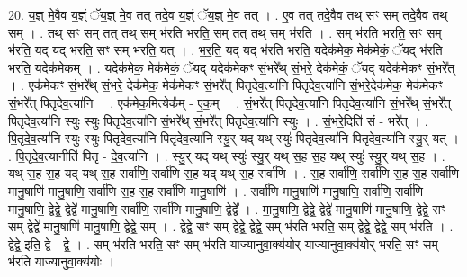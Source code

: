\documentclass[17pt]{extarticle}
\begin{document}
20. य॒ज्ञ् मे॒वैव य॒ज्ञ्ं ॅय॒ज्ञ् मे॒व तत् तदे॒व य॒ज्ञ्ं ॅय॒ज्ञ् मे॒व तत् । . ए॒व तत् तदे॒वैव तथ् सꣳ सम् तदे॒वैव तथ् सम् । . तथ् सꣳ सम् तत् तथ् सम् भ॑रति भरति॒ सम् तत् तथ् सम् भ॑रति । . सम् भ॑रति भरति॒ सꣳ सम् भ॑रति॒ यद् यद् भ॑रति॒ सꣳ सम् भ॑रति॒ यत् । . भ॒र॒ति॒ यद् यद् भ॑रति भरति॒ यदेक॑मेक॒ मेक॑मेकं॒ ॅयद् भ॑रति भरति॒ यदेक॑मेकम् । . यदेक॑मेक॒ मेक॑मेकं॒ ॅयद् यदेक॑मेकꣳ सं॒भरे᳚थ् सं॒भरे॒ देक॑मेकं॒ ॅयद् यदेक॑मेकꣳ सं॒भरे᳚त् । . एक॑मेकꣳ सं॒भरे᳚थ् सं॒भरे॒ देक॑मेक॒ मेक॑मेकꣳ सं॒भरे᳚त् पितृदेव॒त्या॑नि पितृदेव॒त्या॑नि सं॒भरे॒देक॑मेक॒ मेक॑मेकꣳ सं॒भरे᳚त् पितृदेव॒त्या॑नि । . एक॑मेक॒मित्येक᳚म् - ए॒क॒म् । . सं॒भरे᳚त् पितृदेव॒त्या॑नि पितृदेव॒त्या॑नि सं॒भरे᳚थ् सं॒भरे᳚त् पितृदेव॒त्या॑नि स्युः स्युः पितृदेव॒त्या॑नि सं॒भरे᳚थ् सं॒भरे᳚त् पितृदेव॒त्या॑नि स्युः । . सं॒भरे॒दिति॑ सं - भरे᳚त् । . पि॒तृ॒दे॒व॒त्या॑नि स्युः स्युः पितृदेव॒त्या॑नि पितृदेव॒त्या॑नि स्यु॒र् यद् यथ् स्युः॑ पितृदेव॒त्या॑नि पितृदेव॒त्या॑नि स्यु॒र् यत् । . पि॒तृ॒दे॒व॒त्या॑नीति॑ पितृ - दे॒व॒त्या॑नि । . स्यु॒र् यद् यथ् स्युः॑ स्यु॒र् यथ् स॒ह स॒ह यथ् स्युः॑ स्यु॒र् यथ् स॒ह । . यथ् स॒ह स॒ह यद् यथ् स॒ह सर्वा॑णि॒ सर्वा॑णि स॒ह यद् यथ् स॒ह सर्वा॑णि । . स॒ह सर्वा॑णि॒ सर्वा॑णि स॒ह स॒ह सर्वा॑णि मानु॒षाणि॑ मानु॒षाणि॒ सर्वा॑णि स॒ह स॒ह सर्वा॑णि मानु॒षाणि॑ । . सर्वा॑णि मानु॒षाणि॑ मानु॒षाणि॒ सर्वा॑णि॒ सर्वा॑णि मानु॒षाणि॒ द्वेद्वे॒ द्वेद्वे॑ मानु॒षाणि॒ सर्वा॑णि॒ सर्वा॑णि मानु॒षाणि॒ द्वेद्वे᳚ । . मा॒नु॒षाणि॒ द्वेद्वे॒ द्वेद्वे॑ मानु॒षाणि॑ मानु॒षाणि॒ द्वेद्वे॒ सꣳ सम् द्वेद्वे॑ मानु॒षाणि॑ मानु॒षाणि॒ द्वेद्वे॒ सम् । . द्वेद्वे॒ सꣳ सम् द्वेद्वे॒ द्वेद्वे॒ सम् भ॑रति भरति॒ सम् द्वेद्वे॒ द्वेद्वे॒ सम् भ॑रति । . द्वेद्वे॒ इति॒ द्वे - द्वे॒ । . सम् भ॑रति भरति॒ सꣳ सम् भ॑रति याज्यानुवा॒क्य॑योर् याज्यानुवा॒क्य॑योर् भरति॒ सꣳ सम् भ॑रति याज्यानुवा॒क्य॑योः । \newline
\end{document}
